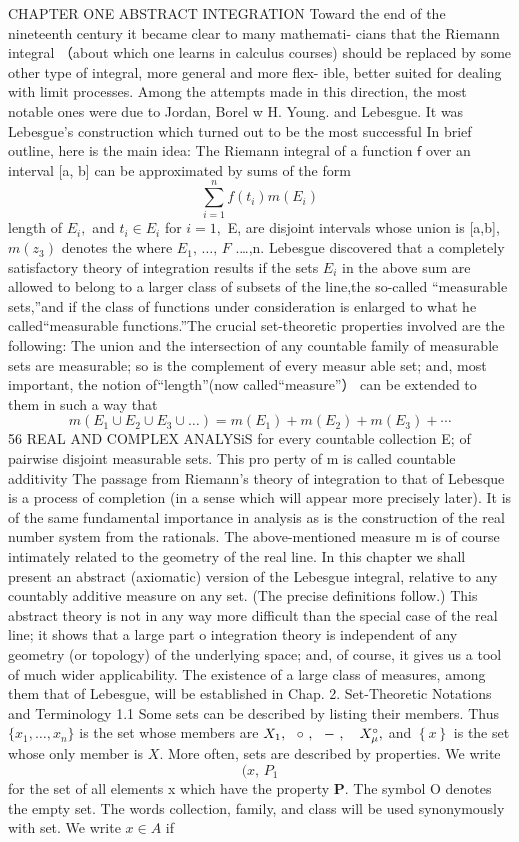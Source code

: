 CHAPTER ONE ABSTRACT INTEGRATION Toward the end of the nineteenth century it became clear to many mathemati- cians that the Riemann integral （about which one learns in calculus courses) should be replaced by some other type of integral, more general and more flex- ible, better suited for dealing with limit processes. Among the attempts made in this direction, the most notable ones were due to Jordan, Borel w H. Young. and Lebesgue. It was Lebesgue's construction which turned out to be the most successful In brief outline, here is the main idea: The Riemann integral of a function $\boldsymbol{\mathsf{f}}$ over an interval [a, b] can be approximated by sums of the form $$ \sum_{i=1}^{n}f(t_{i})m(E_{i}) $$ length of $E_{i},$ and $t_{i}\in E_{i}$ for $i=1,$ E, are disjoint intervals whose union is [a,b], $\scriptstyle m(z_{3})$ denotes the where $E_{1},\,\ldots,\,F$ .…,n. Lebesgue discovered that a completely satisfactory theory of integration results if the sets $\textstyle E_{i}$ in the above sum are allowed to belong to a larger class of subsets of the line,the so-called “measurable sets,”and if the class of functions under consideration is enlarged to what he called“measurable functions.”The crucial set-theoretic properties involved are the following: The union and the intersection of any countable family of measurable sets are measurable; so is the complement of every measur able set; and, most important, the notion of“length”(now called“measure”） can be extended to them in such a way that $$ m(E_{1}\cup E_{2}\cup E_{3}\cup\dots)=m(E_{1})+m(E_{2})+m(E_{3})+\cdots $$ 56 REAL AND COMPLEX ANALYSiS for every countable collection {E;} of pairwise disjoint measurable sets. This pro perty of m is called countable additivity The passage from Riemann's theory of integration to that of Lebesque is a process of completion (in a sense which will appear more precisely later). It is of the same fundamental importance in analysis as is the construction of the real number system from the rationals. The above-mentioned measure m is of course intimately related to the geometry of the real line. In this chapter we shall present an abstract (axiomatic) version of the Lebesgue integral, relative to any countably additive measure on any set. (The precise definitions follow.) This abstract theory is not in any way more difficult than the special case of the real line; it shows that a large part o integration theory is independent of any geometry (or topology) of the underlying space; and, of course, it gives us a tool of much wider applicability. The existence of a large class of measures, among them that of Lebesgue, will be established in Chap. 2. Set-Theoretic Notations and Terminology 1.1 Some sets can be described by listing their members. Thus $\{x_{1},\ldots,x_{n}\}$ is the set whose members are $X_{\mathrm{1}},\ \ \circ\ ,\ \ -\ ,\ \ \ X_{\mu}\sp{\circ},$ and $\left\{x\right\}$ is the set whose only member is $\scriptstyle{X.}$ More often, sets are described by properties. We write $$ \scriptstyle(x,\,P_{1} $$ for the set of all elements x which have the property ${\boldsymbol{P}}.$ The symbol O denotes the empty set. The words collection, family, and class will be used synonymously with set. We write $x\in A$ if 